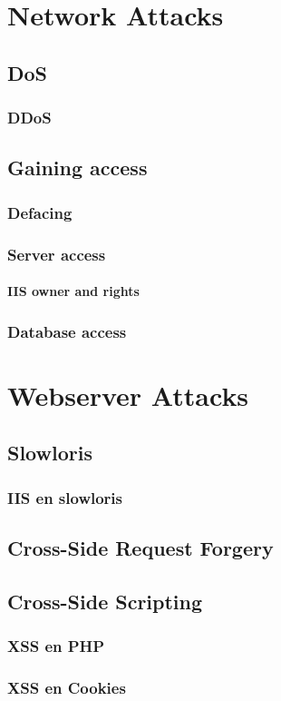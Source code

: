 \documentclass[a4paper,12pt,twoside,openright,titlepage]{book}
\begin{document}
\chapter{Network Attacks}
\section{DoS}

\subsection{DDoS}

\section{Gaining access}

\subsection{Defacing}

\subsection{Server access}

\subsubsection{IIS owner and rights}

\subsection{Database access}


\chapter{Webserver Attacks}
\section{Slowloris}

\subsection{IIS en slowloris}

\section{Cross-Side Request Forgery}

\section{Cross-Side Scripting}

\subsection{XSS en PHP}

\subsection{XSS en Cookies}



\printindex
\end{document}
